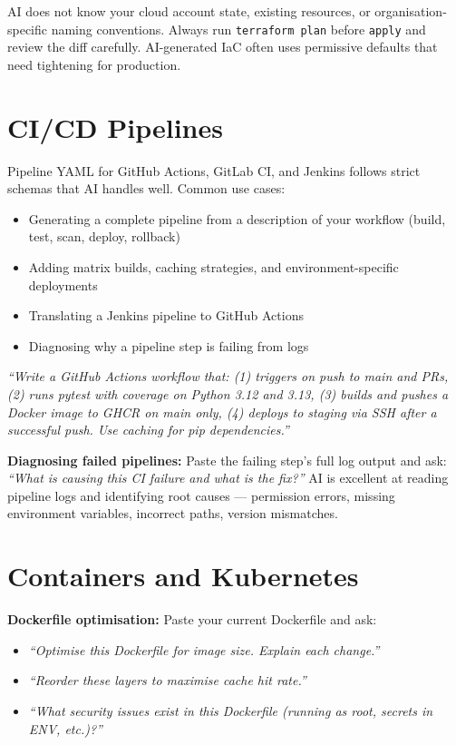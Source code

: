 \begin{warnbox}
AI does not know your cloud account state, existing resources, or organisation-specific
naming conventions.
Always run \texttt{terraform plan} before \texttt{apply} and review the diff carefully.
AI-generated IaC often uses permissive defaults that need tightening for production.
\end{warnbox}

\section{CI/CD Pipelines}
\label{sec:cicd}

Pipeline YAML for GitHub Actions, GitLab CI, and Jenkins follows strict schemas that
AI handles well.
Common use cases:
\begin{itemize}
  \item Generating a complete pipeline from a description of your workflow (build, test, scan, deploy, rollback)
  \item Adding matrix builds, caching strategies, and environment-specific deployments
  \item Translating a Jenkins pipeline to GitHub Actions
  \item Diagnosing why a pipeline step is failing from logs
\end{itemize}

\begin{tipbox}
\textit{``Write a GitHub Actions workflow that: (1) triggers on push to main and PRs, (2) runs pytest with coverage on Python 3.12 and 3.13, (3) builds and pushes a Docker image to GHCR on main only, (4) deploys to staging via SSH after a successful push. Use caching for pip dependencies.''}
\end{tipbox}

\textbf{Diagnosing failed pipelines:}
Paste the failing step's full log output and ask:
\textit{``What is causing this CI failure and what is the fix?''}
AI is excellent at reading pipeline logs and identifying root causes --- permission
errors, missing environment variables, incorrect paths, version mismatches.

\section{Containers and Kubernetes}
\label{sec:k8s}

\textbf{Dockerfile optimisation:}
Paste your current Dockerfile and ask:
\begin{itemize}
  \item \textit{``Optimise this Dockerfile for image size. Explain each change.''}
  \item \textit{``Reorder these layers to maximise cache hit rate.''}
  \item \textit{``What security issues exist in this Dockerfile (running as root, secrets in ENV, etc.)?''}
\end{itemize}

